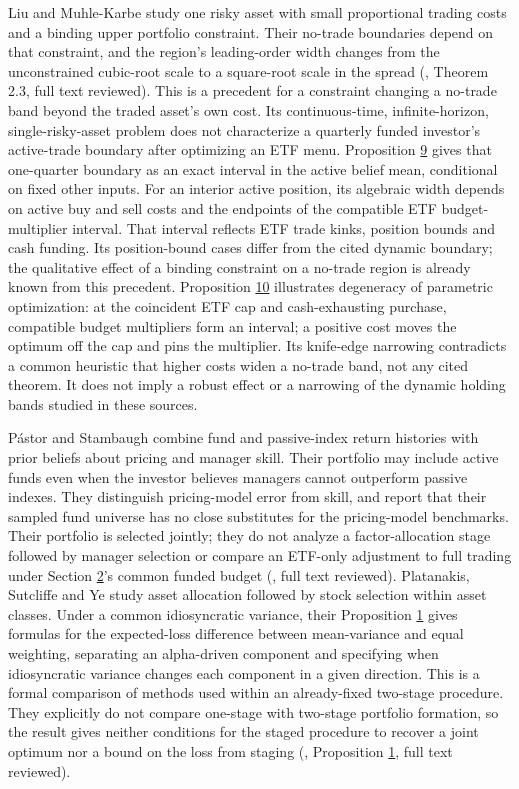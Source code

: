 \documentclass[11pt]{article}
\begin{document}
Liu and Muhle-Karbe study one risky asset with small proportional trading costs
and a binding upper portfolio constraint. Their no-trade boundaries depend on
that constraint, and the region's leading-order width changes from the
unconstrained cubic-root scale to a square-root scale in the spread
(\cite{liu2013portfolio}, Theorem 2.3, full text reviewed). This is a
precedent for a constraint changing a no-trade band beyond the traded asset's
own cost. Its continuous-time, infinite-horizon, single-risky-asset problem
does not characterize a quarterly funded investor's active-trade boundary
after optimizing an ETF menu. Proposition \hyperref[res:Proposition-9]{9} gives that one-quarter boundary
as an exact interval in the active belief mean, conditional on fixed other inputs.
For an interior active position, its algebraic width depends on active buy and
sell costs and the endpoints of the compatible ETF budget-multiplier interval.
That interval reflects ETF trade kinks, position bounds and cash funding. Its
position-bound cases differ from the cited dynamic boundary; the qualitative
effect of a binding constraint on a no-trade region is already known from this
precedent. Proposition \hyperref[res:Proposition-10]{10} illustrates degeneracy
of parametric optimization: at the coincident ETF cap and cash-exhausting
purchase, compatible budget multipliers form an interval; a positive
cost moves the optimum off the cap and pins the multiplier. Its
knife-edge narrowing contradicts a common heuristic that higher
costs widen a no-trade band, not any cited theorem. It does not
imply a robust effect or a narrowing of the dynamic holding bands
studied in these sources.

Pástor and Stambaugh combine fund and passive-index return histories with prior beliefs
about pricing and manager skill. Their portfolio may include active funds even when the
investor believes managers cannot outperform passive indexes. They distinguish pricing-model
error from skill, and report that their sampled fund universe has no close substitutes
for the pricing-model benchmarks. Their portfolio is selected jointly; they do not
analyze a factor-allocation stage followed by manager selection or compare an ETF-only
adjustment to full trading under Section \hyperref[sec:2]{2}'s common funded budget (\cite{pastor2002investing},
full text reviewed). Platanakis, Sutcliffe and Ye study asset allocation followed by
stock selection within asset classes. Under a common idiosyncratic variance,
their Proposition \hyperref[res:Proposition-1]{1} gives formulas for the expected-loss difference between
mean-variance and equal weighting, separating an alpha-driven component and
specifying when idiosyncratic variance changes each component in a given
direction. This is a formal comparison of methods used within an
already-fixed two-stage procedure. They explicitly do not compare one-stage with
two-stage portfolio formation, so the result gives neither conditions for the
staged procedure to recover a joint optimum nor a bound on the loss from staging
(\cite{platanakis2019horses}, Proposition \hyperref[res:Proposition-1]{1}, full text reviewed).
\end{document}
